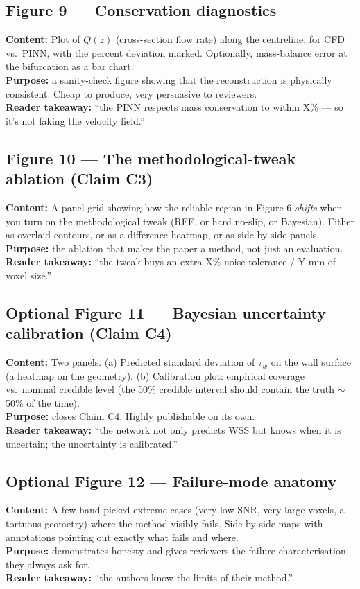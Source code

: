 \documentclass[11pt]{article}
\begin{document}
\subsection*{Figure 9 --- Conservation diagnostics}
\textbf{Content:} Plot of $Q(z)$ (cross-section flow rate) along the centreline, for CFD vs.\ PINN, with the percent deviation marked. Optionally, mass-balance error at the bifurcation as a bar chart.\\
\textbf{Purpose:} a sanity-check figure showing that the reconstruction is physically consistent. Cheap to produce, very persuasive to reviewers.\\
\textbf{Reader takeaway:} ``the PINN respects mass conservation to within X\% --- so it's not faking the velocity field.''

\subsection*{Figure 10 --- The methodological-tweak ablation (Claim C3)}
\textbf{Content:} A panel-grid showing how the reliable region in Figure 6 \emph{shifts} when you turn on the methodological tweak (RFF, or hard no-slip, or Bayesian). Either as overlaid contours, or as a difference heatmap, or as side-by-side panels.\\
\textbf{Purpose:} the ablation that makes the paper a method, not just an evaluation.\\
\textbf{Reader takeaway:} ``the tweak buys an extra X\% noise tolerance / Y mm of voxel size.''

\subsection*{Optional Figure 11 --- Bayesian uncertainty calibration (Claim C4)}
\textbf{Content:} Two panels. (a) Predicted standard deviation of $\tau_w$ on the wall surface (a heatmap on the geometry). (b) Calibration plot: empirical coverage vs.\ nominal credible level (the 50\% credible interval should contain the truth $\sim$50\% of the time).\\
\textbf{Purpose:} closes Claim C4. Highly publishable on its own.\\
\textbf{Reader takeaway:} ``the network not only predicts WSS but knows when it is uncertain; the uncertainty is calibrated.''

\subsection*{Optional Figure 12 --- Failure-mode anatomy}
\textbf{Content:} A few hand-picked extreme cases (very low SNR, very large voxels, a tortuous geometry) where the method visibly fails. Side-by-side maps with annotations pointing out exactly what fails and where.\\
\textbf{Purpose:} demonstrates honesty and gives reviewers the failure characterisation they always ask for.\\
\textbf{Reader takeaway:} ``the authors know the limits of their method.''
\end{document}
